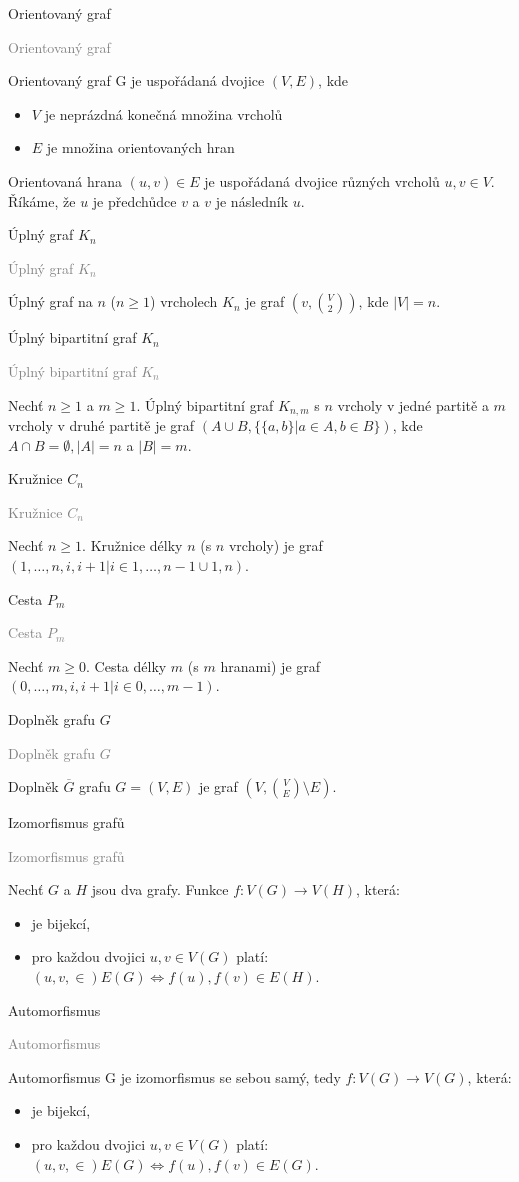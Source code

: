 \documentclass[20pt]{extarticle}
\newcommand{\card}[3][]{
	\vspace*{\fill}

	\newpage
	\topskip0pt
	\vspace*{\fill}
		\Large #2

		\vspace{1cm}
		\normalsize #1
	\vspace*{\fill}
	\newpage

	\small \textcolor{gray}{#2 #1}
	\topskip0pt
	\vspace*{\fill}

	\normalsize
	#3
	\vspace*{\fill}
}
\newcommand{\pair}[2]{\left(#1, #2\right)}
\newcommand{\graph}{G=\pair{V}{E}}
\begin{document}
\begin{center}
\card{Orientovaný graf}{
  Orientovaný graf G je uspořádaná dvojice $\pair{V}{E}$, kde
  \begin{itemize}
    \item $V$ je neprázdná konečná množina vrcholů
    \item $E$ je množina orientovaných hran
  \end{itemize}
  Orientovaná hrana $\pair{u}{v} \in E$ je uspořádaná dvojice různých vrcholů $u, v \in V$.\\
	Říkáme, že $u$ je předchůdce $v$ a $v$ je následník $u$.
}

\card{Úplný graf $K_n$}{
  Úplný graf na $n$ ($n \ge 1 $) vrcholech $K_n$ je graf $\pair{v}{\binom{V}{2}}$, kde $|V| = n$.
}

\card{Úplný bipartitní graf $K_n$}{
  Nechť $n \geq 1$ a $m \geq 1$.
  Úplný bipartitní graf $K_{n,m}$ s $n$ vrcholy v jedné partitě a $m$ vrcholy v druhé
  partitě je graf $(A \cup B, \{\{a,b\} | a \in A,b \in B\})$, kde\\
  $A \cap B = \emptyset, |A| = n$ a $|B| = m$.
}

\card{Kružnice $C_n$}{
  Nechť $n \geq 1$. Kružnice délky $n$ (s $n$ vrcholy) je graf
  $({1, \dots, n}, {{i, i+1} | i \in {1, \dots, n-1}} \cup {{1, n}})$.
}

\card{Cesta $P_m$}{
  Nechť $m \geq 0$. Cesta délky $m$ (s $m$ hranami) je graf
  $({0, \dots, m}, {{i, i+1} | i \in {0, \dots, m-1}})$.
}

\card{Doplněk grafu $G$}{
  Doplněk $\overline{G}$ grafu $\graph$ je graf $\pair{V}{\binom{V}{E} \setminus E}$.
}

\card{Izomorfismus grafů}{
  Nechť $G$ a $H$ jsou dva grafy. Funkce $f: V(G) \rightarrow V(H)$, která:
  \begin{itemize}
    \item je bijekcí,
    \item pro každou dvojici $u, v \in V(G)$ platí: $\pair{u,v} \in E(G) \Leftrightarrow {f(u), f(v)} \in E(H)$.
  \end{itemize}
}

\card{Automorfismus}{
  Automorfismus G je izomorfismus se sebou samý, tedy $f: V(G) \rightarrow V(G)$, která:
  \begin{itemize}
    \item je bijekcí,
    \item pro každou dvojici $u, v \in V(G)$ platí: $\pair{u,v} \in E(G) \Leftrightarrow {f(u), f(v)} \in E(G)$.
  \end{itemize}
}


\end{center}
\end{document}
